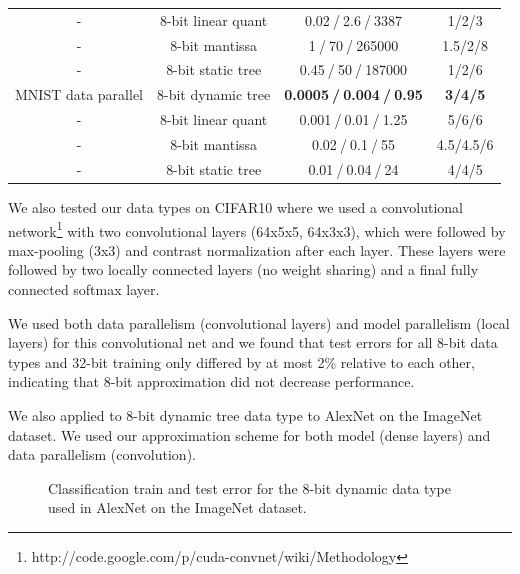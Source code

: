 \documentclass{article} %
\begin{document}
\begin{table}[h]
\begin{minipage}
\begin{tabular}{ cccc}
- & 8-bit linear quant & 0.02$\>$/$\>$2.6$\>$/$\>$3387 & 1/2/3 \\
- & 8-bit mantissa & 1$\>$/$\>$70$\>$/$\>$265000  & 1.5/2/8\\
- & 8-bit static tree & 0.45$\>$/$\>$50$\>$/$\>$187000 &  1/2/6 \\\midrule
MNIST data parallel & 8-bit dynamic tree & {\bf 0.0005$\>$/$\>$0.004$\>$/$\>$0.95} &  {\bf3/4/5} \\
- & 8-bit linear quant & 0.001$\>$/$\>$0.01$\>$/$\>$1.25 & 5/6/6 \\
- & 8-bit mantissa & 0.02$\>$/$\>$0.1$\>$/$\>$55 & 4.5/4.5/6\\
- & 8-bit static tree & 0.01$\>$/$\>$0.04$\>$/$\>$24&  4/4/5\\
\bottomrule[1.25pt]
\end{tabular}
\par
\bigskip
\end{minipage}
\end{table}

We also tested our data types on CIFAR10 where we used a convolutional network\footnote{http://code.google.com/p/cuda-convnet/wiki/Methodology} with two convolutional layers (64x5x5, 64x3x3), which were followed by max-pooling (3x3) and contrast normalization after each layer. These layers were followed by two locally connected layers (no weight sharing) and a final fully connected softmax layer.

We used both data parallelism (convolutional layers) and model parallelism (local layers) for this convolutional net and we found that test errors for all 8-bit data types and 32-bit training only differed by at most 2\% relative to each other, indicating that 8-bit approximation did not decrease performance.

We also applied to 8-bit dynamic tree data type to AlexNet on the ImageNet dataset. We used our approximation scheme for both model (dense layers) and data parallelism (convolution). 

\begin{figure}[h]
	\begin{center}
	\end{center}
	\caption{Classification train and test error for the 8-bit dynamic data type used in AlexNet on the ImageNet dataset.}
\end{figure}
\end{document}

